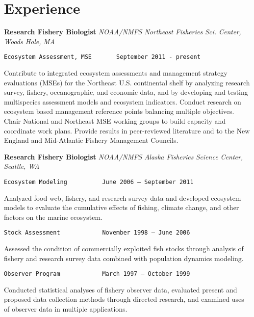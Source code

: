 \documentclass[11pt, a4paper]{awesome-cv}
\begin{document}
\hypertarget{experience}{%
\section{Experience}\label{experience}}

\textbf{Research Fishery Biologist} \emph{NOAA/NMFS Northeast Fisheries Sci. Center, Woods Hole, MA}

\begin{verbatim}
Ecosystem Assessment, MSE       September 2011 - present
\end{verbatim}

Contribute to integrated ecosystem assessments and management strategy evaluations (MSEs) for the Northeast U.S. continental shelf by analyzing research survey, fishery, oceanographic, and economic data, and by developing and testing multispecies assessment models and ecosystem indicators. Conduct research on ecosystem based management reference points balancing multiple objectives. Chair National and Northeast MSE working groups to build capacity and coordinate work plans. Provide results in peer-reviewed literature and to the New England and Mid-Atlantic Fishery Management Councils.

\textbf{Research Fishery Biologist} \emph{NOAA/NMFS Alaska Fisheries Science Center, Seattle, WA}

\begin{verbatim}
Ecosystem Modeling          June 2006 – September 2011
\end{verbatim}

Analyzed food web, fishery, and research survey data and developed ecosystem models to evaluate the cumulative effects of fishing, climate change, and other factors on the marine ecosystem.

\begin{verbatim}
Stock Assessment            November 1998 – June 2006
\end{verbatim}

Assessed the condition of commercially exploited fish stocks through analysis of fishery and research survey data combined with population dynamics modeling.

\begin{verbatim}
Observer Program            March 1997 – October 1999
\end{verbatim}

Conducted statistical analyses of fishery observer data, evaluated present and proposed data collection methods through directed research, and examined uses of observer data in multiple applications.
\end{document}
